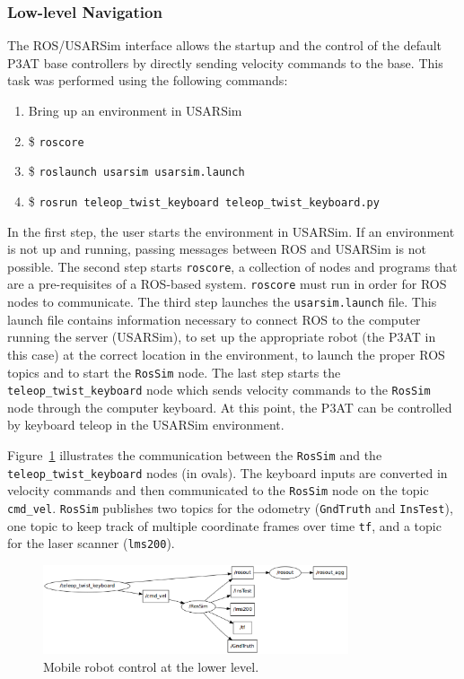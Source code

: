 \subsubsection*{Low-level Navigation}
The ROS/USARSim interface allows the startup and the control of the default P3AT base controllers by directly sending velocity commands to the base. This task was performed using the following commands:
\begin{enumerate}
\item Bring up an environment in USARSim
\item \$ \texttt{roscore}
\item \$ \texttt{roslaunch usarsim usarsim.launch}
\item \$ \texttt{rosrun teleop\_twist\_keyboard teleop\_twist\_keyboard.py}
\end{enumerate}

In the first step, the user starts the environment in USARSim. If an environment is not up and running, passing messages between ROS and USARSim is not possible. The second step starts \texttt{roscore}, a collection of nodes and programs that are a pre-requisites of a ROS-based system. \texttt{roscore} must run in order for ROS nodes to communicate. The third step launches the \texttt{usarsim.launch} file. This launch file contains information necessary to connect ROS to the computer running the server (USARSim), to set up the appropriate robot (the P3AT in this case) at the correct location in the environment, to launch the proper ROS topics and to start the \texttt{RosSim} node. The last step starts the \texttt{teleop\_twist\_keyboard} node which sends velocity commands to the \texttt{RosSim} node through the computer keyboard. At this point, the P3AT can be controlled by keyboard teleop in the USARSim environment.

Figure~\ref{fig:teleop} illustrates the communication between the \texttt{RosSim} and the \texttt{teleop\_twist\_keyboard} nodes (in ovals). The keyboard inputs are converted in velocity commands and then communicated to the \texttt{RosSim} node on the topic \texttt{cmd\_vel}. \texttt{RosSim} publishes two topics for the odometry (\texttt{GndTruth} and \texttt{InsTest}), one topic to keep track of multiple coordinate frames over time \texttt{tf}, and a topic for the laser scanner (\texttt{lms200}).
\begin{figure}[h!]
\centering
\includegraphics[width=9cm]{Figures/Misc/teleop-rossim-non-quiet.eps}
\caption{Mobile robot control at the lower level.}\label{fig:teleop}
\end{figure}

